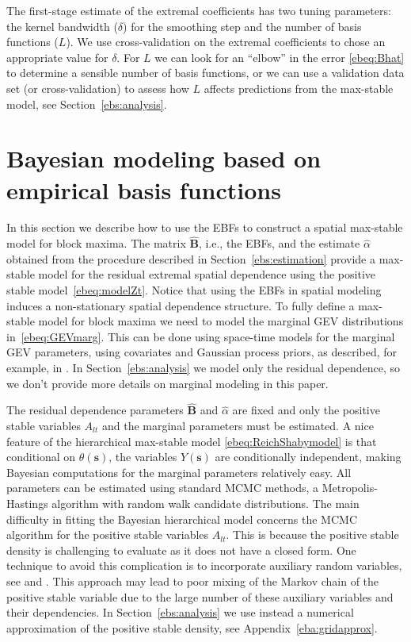 \documentclass[12pt]{article}
\newcommand{\bB}{\ensuremath{\mathbf{B}}}
\newcommand{\bs}{\ensuremath{\mathbf{s}}}
\newcommand{\sref}[1]{Section~\ref{#1}}
\newcommand{\aref}[1]{Appendix~\ref{#1}}
\begin{document}
The first-stage estimate of the extremal coefficients has two tuning parameters: the kernel bandwidth ($\delta$) for the smoothing step and the number of basis functions ($L$). We use cross-validation on the extremal coefficients to chose an appropriate value for $\delta$. For $L$ we can look for an ``elbow'' in the  error \eqref{ebeq:Bhat} to determine a sensible number of basis functions, or we can use a validation data set (or cross-validation) to assess how $L$ affects predictions from the max-stable model, see \sref{ebs:analysis}.

\section{Bayesian modeling based on empirical basis functions}\label{ebs:MCMC} In this section we describe how to use the EBFs to construct a spatial max-stable model for block maxima. The matrix $\hat{\bB}$, i.e., the EBFs, and the estimate $\hat\alpha$ obtained from the procedure described in Section~\ref{ebs:estimation} provide a max-stable model for the residual extremal spatial dependence using the positive stable model~\eqref{ebeq:modelZt}. Notice that using the EBFs in spatial modeling induces a non-stationary spatial dependence structure. To fully define a max-stable model for block maxima we need to model the marginal GEV distributions in~\eqref{ebeq:GEVmarg}. This can be done using space-time models for the marginal GEV parameters, using covariates and Gaussian process priors, as described, for example, in \citet{Reich2012}. In \sref{ebs:analysis} we model only the residual dependence, so we don't provide more details on marginal modeling in this paper. 

The residual dependence parameters $\hat{\bB}$ and $\hat\alpha$ are fixed and only the positive stable variables $A_{lt}$ and the marginal parameters must be estimated. A nice feature of the hierarchical max-stable model \eqref{ebeq:ReichShabymodel} is that conditional on $\theta(\bs)$, the variables $Y(\bs)$ are conditionally independent, making Bayesian computations for the marginal parameters relatively easy. All parameters can be estimated using standard MCMC methods, a Metropolis-Hastings algorithm with random walk candidate distributions. The main difficulty in fitting the Bayesian hierarchical model concerns the MCMC algorithm for the positive stable variables $A_{lt}$. This is because the positive stable density is challenging to evaluate as it does not have a closed form. One technique to avoid this complication is to incorporate auxiliary random variables, see \citet{Stephenson2009} and \citet{Reich2012}. This approach may lead to poor mixing of the Markov chain of the positive stable variable due to the large number of these auxiliary variables and their dependencies. In \sref{ebs:analysis} we use instead a numerical approximation of the positive stable density, see \aref{eba:gridapprox}.
\end{document}

